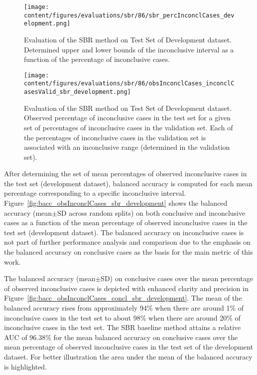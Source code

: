 \begin{figure}[ht]
    \centering
    \texttt{[image: content/figures/evaluations/sbr/86/sbr\_percInconclCases\_development.png]}
    \caption{Evaluation of the SBR method on Test Set of Development dataset. 
    Determined upper and lower bounds of the inconclusive interval as a function of the percentage of inconclusive cases.} 
    \label{fig:sbr_percInconclCases_development}
\end{figure}


\begin{figure}[ht]
    \centering
    \texttt{[image: content/figures/evaluations/sbr/86/obsInconclCases\_inconclCasesValid\_sbr\_development.png]}
    \caption{Evaluation of the SBR method on Test Set of Development dataset.
    Observed percentage of inconclusive cases in the test set 
    for a given set of percentages of inconclusive cases in the validation set.
    Each of the percentages of inconclusive cases in the validation set is associated 
    with an inconclusive range (determined in the validation set).} 
    \label{fig:obsInconclCases_inconclCasesValid_sbr_development}
\end{figure} 


After determining the set of mean percentages of observed inconclusive cases in the test set (development dataset), 
balanced accuracy is computed for each mean percentage corresponding to a specific inconclusive interval.
Figure~\ref{fig:bacc_obsInconclCases_sbr_development} shows the balanced accuracy (mean$\pm$SD across random splits) 
on both conclusive and inconclusive cases as a function of the mean percentage of observed inconclusive cases 
in the test set (development dataset).
The balanced accuracy on inconclusive cases is not part of further performance analysis and comparison 
due to the emphasis on the balanced accuracy on conclusive cases as the basis for the main metric of this work.

The balanced accuracy (mean$\pm$SD) on conclusive cases over the mean percentage of observed inconclusive cases 
is depicted with enhanced clarity and precision in Figure~\ref{fig:bacc_obsInconclCases_concl_sbr_development}.
The mean of the balanced accuracy rises from approximately 94\% 
when there are around 1\% of inconclusive cases in the test set to about 98\% 
when there are around 20\% of inconclusive cases in the test set.
The SBR baseline method attains a relative AUC of 96.38\% for the mean balanced accuracy on conclusive cases
over the mean percentage of observed inconclusive cases in the test set of the development dataset.
For better illustration the area under the mean of the balanced accuracy is highlighted.

